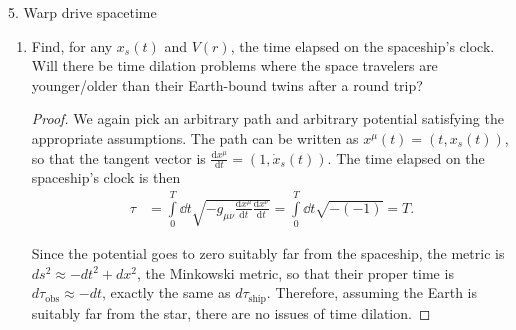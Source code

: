 \documentclass[11pt]{article}
\begin{document}
\begin{problem}{5. Warp drive spacetime}
\begin{enumerate}[label=(\alph*)]
\begin{proof}
            Then, evaluating \cref{eq:8} for this path gives
            \begin{equation}
            \label{eq:43}
            \begin{aligned}
              ds^2 &= -dt^2 + (\dot{x}_s(t)dt - \dot{x}_s(t)V(|x_s(t) - x_s(t))dt)^2 \\
              &= -dt^2 + (\dot{x}_s(t) - \dot{x}_s(t))^2dt^2 = -dt^2,
            \end{aligned}
            \end{equation}
            showing that for all \( t > 0 \), \( ds^2 < 0 \), that is, the path is timelike.
          \end{proof}
		\item Find, for any \( x_s(t) \) and \( V(r) \), the time elapsed on the spaceship's clock.
		      Will there be time dilation problems where the space travelers are younger/older than their Earth-bound twins after a round trip?
          \begin{proof}
            We again pick an arbitrary path and arbitrary potential satisfying the appropriate assumptions.
            The path can be written as \( x^{\mu}(t) = (t, x_s(t)) \), so that the tangent vector is \( \frac{\mathrm{d} x^{\mu}}{\mathrm{d} t} = (1, \dot{x}_s(t)) \).
            The time elapsed on the spaceship's clock is then
            \begin{equation}
            \label{eq:44}
            \begin{aligned}
              \tau &= \int\limits_0^T \dd t \sqrt{-g_{\mu\nu} \frac{\mathrm{d} x^{\mu}}{\mathrm{d} t} \frac{\mathrm{d} x^{\nu}}{\mathrm{d} t}} = \int\limits_0^T \dd t \sqrt{-(-1)} = T.
            \end{aligned}
            \end{equation}

            Since the potential goes to zero suitably far from the spaceship, the metric is \( ds^2 \approx -dt^2 + dx^2 \), the Minkowski metric, so that their proper time is \( d\tau_{\text{obs}} \approx -dt \), exactly the same as \( d\tau_{\text{ship}} \).
            Therefore, assuming the Earth is suitably far from the star, there are no issues of time dilation.
          \end{proof}
	\end{enumerate}
\end{problem}
\end{document}
